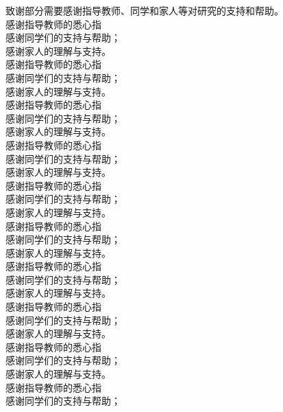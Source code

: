 \documentclass{document}
\begin{document}
\begin{cquacknowledgements}
    

    致谢部分需要感谢指导教师、同学和家人等对研究的支持和帮助。\\
        
   
           感谢指导教师的悉心指\\
           感谢同学们的支持与帮助；\\
            感谢家人的理解与支持。\\
            感谢指导教师的悉心指\\
            感谢同学们的支持与帮助；\\
             感谢家人的理解与支持。\\
             感谢指导教师的悉心指\\
             感谢同学们的支持与帮助；\\
              感谢家人的理解与支持。\\
              感谢指导教师的悉心指\\
              感谢同学们的支持与帮助；\\
               感谢家人的理解与支持。\\
               感谢指导教师的悉心指\\
               感谢同学们的支持与帮助；\\
                感谢家人的理解与支持。\\
                感谢指导教师的悉心指\\
                感谢同学们的支持与帮助；\\
                 感谢家人的理解与支持。\\
                 感谢指导教师的悉心指\\
                 感谢同学们的支持与帮助；\\
                  感谢家人的理解与支持。\\
                  感谢指导教师的悉心指\\
                  感谢同学们的支持与帮助；\\
                   感谢家人的理解与支持。\\
                   感谢指导教师的悉心指\\
                   感谢同学们的支持与帮助；\\
                    感谢家人的理解与支持。\\
                    感谢指导教师的悉心指\\
                    感谢同学们的支持与帮助；\\

\end{cquacknowledgements}
\end{document}
